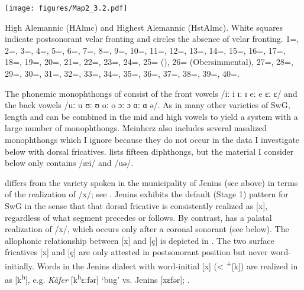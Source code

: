 \begin{map}
\texttt{[image: figures/Map2\_3.2.pdf]}
  \caption[High Alemannic  and Highest Alemannic]{High Alemannic (HAlmc) and Highest Alemannic (HstAlmc). White squares indicate postsonorant velar fronting and circles the absence of velar fronting. 1=\citet{Winteler1876}, 2=\citet{Abegg1910}, 3=\citet{Enderlin1910}, 4=\citet{Kaiser1910}, 5=\citet{Vetsch1910}, 6=\citet{Wipf1910}, 7=\citet{Hausknecht1911},  8=\citet{Berger1913}, 9=\citet{Gröger1914a}, 10=\citet{Gröger1914b}, 11=\citet{Gröger1914c}, 12=\citet{Gröger1914d}, 13=\citet{Gröger1914e}, 14=\citet{Schmid1915}, 15=\citet{Streiff1915}, 16=\citet{Wiget1916}, 17=\citet{Stucki1917}, 18=\citet{Brun1918}, 19=\citet{Meinherz1920}, 20=\citet{Baumgartner1922}, 21=\citet{Jutz1922}, 22=\citet{Weber1923}, 23=\citet{Jutz1925}, 24=\citet{Beck1926}, 25=\citet{Henzen1927} (), 26=\citet{Henzen1927} (Obersimmental), 27=\citet{Henzen1928, Henzen1932}, 28=\citet{Clauss1929}, 29=\citet{Kessler1931}, 30=\citet{Hotzenköcherle1934}, 31=\citet{Wanner1941}, 32=\citet{Schultz1951}, 33=\citet{Keller1961}, 34=\citet{Keller1963}, 35=\citet{Schmid1969}, 36=\citet{BethgeBonnin1969}, 37=\citet{Werlen1977}, 38=\citet{Marti1985}, 39=\citet{Russ2002}, 40=\citet{FleischerSchmid2006}.}
  \label{fig:3.2}\label{map:2}
\end{map}

The phonemic monophthongs of  \citep[22]{Meinherz1920} consist of the front vowels /iː i ɪː ɪ eː e ɛː ɛ/ and the back vowels /uː u ʊː ʊ oː o ɔː ɔ ɑː ɑ ə/. As in many other varieties of SwG, length and  can be combined in the mid and high vowels to yield a system with a large number of monophthongs. Meinherz also includes several nasalized monophthongs which I ignore because they do not occur in the data I investigate below with dorsal fricatives. \citet[22]{Meinherz1920} lists fifteen diphthongs, but the material I consider below only contains /æi/ and /uə/.

 differs from\textsubscript{} the variety spoken in the municipality of Jenins (see above) in terms of the realization of /x/; see \citet[26]{Meinherz1920}. Jenins exhibits the default (Stage 1) pattern for SwG in the sense that that dorsal fricative is consistently realized as [x], regardless of what segment precedes or follows. By contrast,  has a palatal realization of /x/, which occurs only after a coronal sonorant (see below). The allophonic relationship between [x] and [ç] is depicted in . The two surface fricatives [x] and [ç] are only attested in postsonorant position but never word-initially. Words in the Jenins dialect with word-initial [x] (< \textsuperscript{+}[k]) are realized in  as [k\textsuperscript{h}], e.g. \textit{Käfer} [k\textsuperscript{h}ɛːfər] ‘bug’ vs. Jenins [xɛfər]; \citet[134]{Meinherz1920}.

